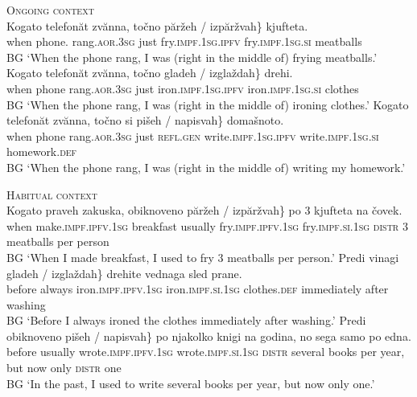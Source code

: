 \documentclass[output=paper,colorlinks,citecolor=brown]{langscibook}
\begin{document}


\ea \label{ongoing:bg:triplet:past} \textsc{Ongoing context}\\
%
\ea \gll Kogato telefonăt zvănna, točno \minsp{\{}  păr\v{z}eh /\hspace{1.7cm} \minsp{*} izpăr\v{z}vah\} kjufteta.\\
when phone.{\DEF} rang.\textsc{aor.3sg} just {} fry.\textsc{impf.1sg.ipfv} {} {} fry.\textsc{impf.1sg.si} meatballs \\ \hfill BG 
\glt `When the phone rang, I was (right in the middle of) frying meatballs.'
%
\ex \gll Kogato telefonăt zvănna, točno \minsp{\{} gladeh /\hspace{1.8cm} \minsp{*} izgla\v{z}dah\} drehi.\\
when phone rang.\textsc{aor.3sg} just
{} iron.\textsc{impf.1sg.ipfv} {} {} iron.\textsc{impf.1sg.si} clothes\\ \hfill BG
\glt `When the phone rang, I was (right in the middle of) ironing clothes.'
%
%
\ex \gll Kogato telefonăt zvănna, točno si \minsp{\{} pišeh /\hspace{0.15cm} \minsp{*} napisvah\} domašnoto. \\
when phone rang.\textsc{aor.3sg} just \textsc{refl.gen}
{} write.\textsc{impf.1sg.ipfv} {} {} write.\textsc{impf.1sg.si} homework.\textsc{def}\\\hfill BG
\glt `When the phone rang, I was (right in the middle of)  writing my homework.'
\z
\z



\ea \label{habitual:bg:triplet:past} \textsc{Habitual context}\\
%
\ea \gll Kogato praveh zakuska, obiknoveno \minsp{\{} păr\v{z}eh / izpăr\v{z}vah\} po 3 kjufteta na čovek.\\
when make.\textsc{impf.ipfv.1sg} breakfast usually {} fry.\textsc{impf.ipfv.1sg} {} fry.\textsc{impf.si.1sg} \textsc{distr} 3 meatballs per person\\ \hfill BG
\glt `When I made breakfast, I used to fry 3 meatballs per person.'
%
\ex \gll Predi vinagi \minsp{\{} gladeh / izgla\v{z}dah\} drehite vednaga sled prane.\\
before always {} iron.\textsc{impf.ipfv.1sg} {} iron.\textsc{impf.si.1sg} clothes.\textsc{def} immediately after washing\\ \hfill BG
\glt `Before I always ironed the clothes immediately after washing.'
%
%
\ex \gll Predi obiknoveno \minsp{\{} pišeh / napisvah\} po njakolko  knigi na godina, no sega samo po edna.\\
%
before usually {} wrote.\textsc{impf.ipfv.1sg} {} wrote.\textsc{impf.si.1sg} \textsc{distr} several books per  year, but now only \textsc{distr} one \\ \hfill BG
%
\glt `In the past, I used to write several books per year, but now only one.'
\z
\z
\end{document}
